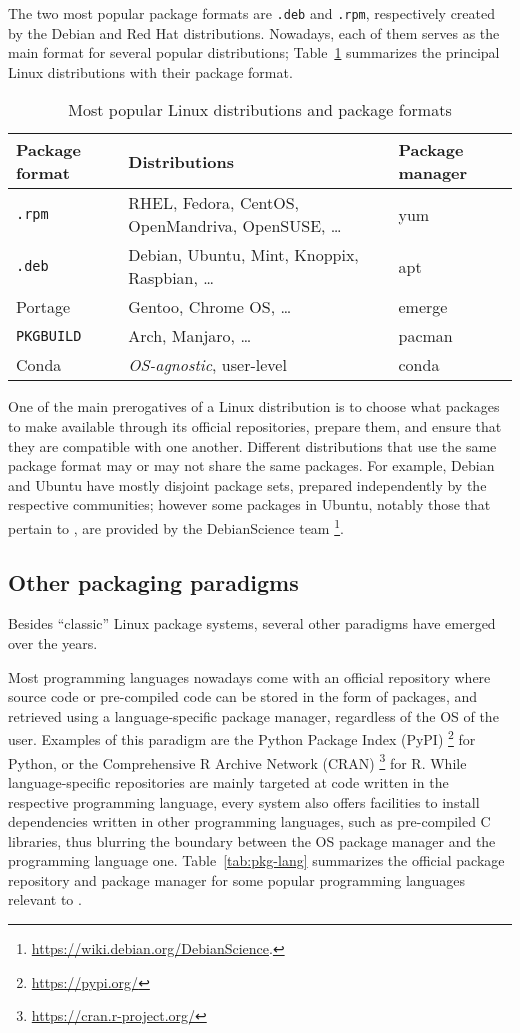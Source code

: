 \documentclass{deliverablereport}
\begin{document}
The two most popular package formats are \texttt{.deb} and
\texttt{.rpm}, respectively created by the Debian and Red Hat
distributions. %
Nowadays, each of them serves as the main format for several popular
distributions; Table~\ref{tab:pkg-fmt} summarizes the principal Linux
distributions with their package format.

\begin{table}[hb]
  \centering
  \begin{tabular}{l | p{} | l}
    Package format & Distributions & Package manager\\
    \hline
    \texttt{.rpm} & RHEL, Fedora, CentOS, OpenMandriva, OpenSUSE, \dots & yum\\
    \texttt{.deb} & Debian, Ubuntu, Mint, Knoppix, Raspbian, \dots & apt \\
    Portage & Gentoo, Chrome OS, \dots & emerge\\
    \texttt{PKGBUILD} & Arch, Manjaro, \dots & pacman\\
    Conda & \emph{OS-agnostic}, user-level & conda
  \end{tabular}
  \caption{Most popular Linux distributions and package formats}
  \label{tab:pkg-fmt}
\end{table}

One of the main prerogatives of a Linux distribution is to choose what
packages to make available through its official repositories, prepare
them, and ensure that they are compatible with one another. %
Different distributions that use the same package format may or may
not share the same packages. %
For example, Debian and Ubuntu have mostly disjoint package sets,
prepared independently by the respective communities; however some
packages in Ubuntu, notably those that pertain to \ODK, are provided
by the DebianScience team%
\footnote{\url{https://wiki.debian.org/DebianScience}.}.

\subsection{Other packaging paradigms}

Besides ``classic'' Linux package systems, several other paradigms
have emerged over the years.

Most programming languages nowadays come with an official repository
where source code or pre-compiled code can be stored in the form of
packages, and retrieved using a language-specific package manager,
regardless of the OS of the user. %
Examples of this paradigm are the Python Package Index (PyPI)%
\footnote{\url{https://pypi.org/}} %
for Python, or the Comprehensive R Archive Network (CRAN)%
\footnote{\url{https://cran.r-project.org/}} %
for R. %
While language-specific repositories are mainly targeted at code
written in the respective programming language, every system also
offers facilities to install dependencies written in other programming
languages, such as pre-compiled C libraries, thus blurring the
boundary between the OS package manager and the programming language
one. %
Table~\ref{tab:pkg-lang} summarizes the official package repository
and package manager for some popular programming languages relevant to
\ODK.
\end{document}
